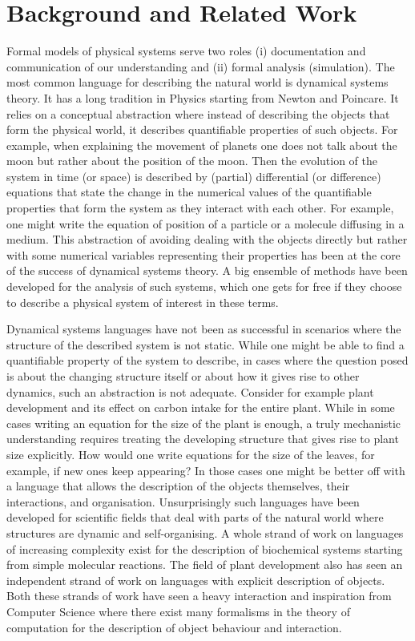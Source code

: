 \documentclass[phd]{infthesis}
\begin{document}
\chapter{Background and Related Work}
\label{chp:relWork}
Formal models of physical systems serve two roles (i) documentation and
communication of our understanding and (ii) formal analysis (simulation). The
most common language for describing the natural world is dynamical systems
theory. It has a long tradition in Physics starting from Newton and Poincare. It
relies on a conceptual abstraction where instead of describing the objects that
form the physical world, it describes quantifiable properties of such
objects. For example, when explaining the movement of planets one does not talk
about the moon but rather about the position of the moon. Then the evolution of
the system in time (or space) is described by (partial) differential (or
difference) equations that state the change in the numerical values of the
quantifiable properties that form the system as they interact with each
other. For example, one might write the equation of position of a particle or a
molecule diffusing in a medium. This abstraction of avoiding dealing with the
objects directly but rather with some numerical variables representing their
properties has been at the core of the success of dynamical systems theory. A
big ensemble of methods have been developed for the analysis of such systems,
which one gets for free if they choose to describe a physical system of interest
in these terms.

Dynamical systems languages have not been as successful in scenarios where the
structure of the  described system is not static. While one might be able to
find a quantifiable property of the system to describe, in cases where the
question posed is about the changing structure itself or about how it gives rise
to other dynamics, such an abstraction is not adequate. Consider for example
plant development and its effect on carbon intake for the entire
plant. While in some cases writing an equation for the size of the plant is
enough, a truly mechanistic understanding requires treating the developing structure that
gives rise to plant size explicitly. How would one write equations for the size
of the leaves, for example, if new ones keep appearing?
In those cases one might be better off with a language that allows the
description of the objects themselves, their interactions, and
organisation. Unsurprisingly such languages have been developed for
scientific fields that deal with parts of the natural world where structures are
dynamic and self-organising. A whole strand of work on languages of
increasing complexity exist for the description of biochemical systems starting
from simple molecular reactions. The field of plant development also has seen an
independent strand of work on languages with explicit description of objects.
Both these strands of work have seen a heavy interaction and inspiration 
from Computer Science where there exist many formalisms in the
theory of computation for the description of object behaviour and interaction.
\end{document}
